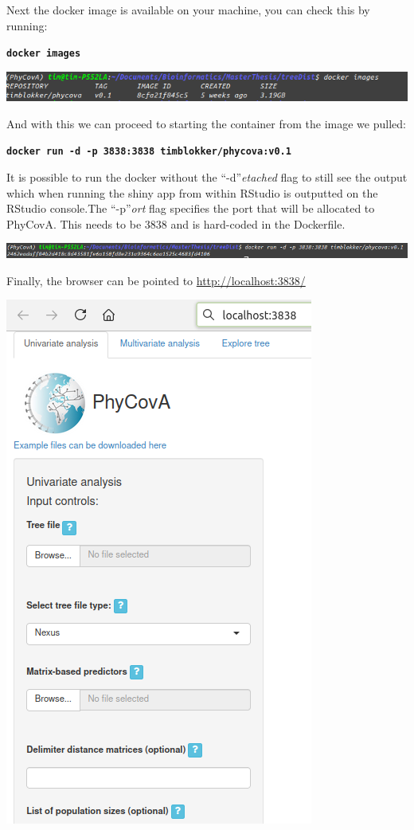 \documentclass[
]{article}
\begin{document}
Next the docker image is available on your machine, you can check this
by running:

\textbf{\texttt{docker\ images}}

\includegraphics{tutorial_img/Docker_Images.png}

And with this we can proceed to starting the container from the image we
pulled:

\textbf{\texttt{docker\ run\ -d\ -p\ 3838:3838\ timblokker/phycova:v0.1}}

It is possible to run the docker without the ``-d''\emph{etached} flag
to still see the output which when running the shiny app from within
RStudio is outputted on the RStudio console.The ``-p''\emph{ort} flag
specifies the port that will be allocated to PhyCovA. This needs to be
3838 and is hard-coded in the Dockerfile.

\includegraphics{tutorial_img/Docker_Run.png}

Finally, the browser can be pointed to \url{http://localhost:3838/}

\includegraphics{tutorial_img/Docker_Started.png}
\end{document}
